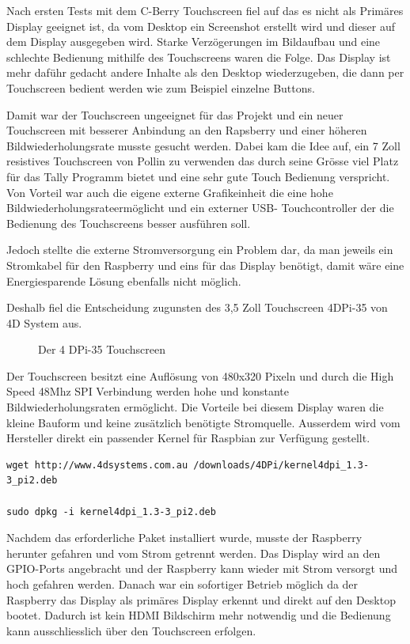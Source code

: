 \documentclass[11pt,a4paper]{article} %
\begin{document}
Nach ersten Tests mit dem C-Berry Touchscreen fiel auf das es nicht als Primäres Display geeignet ist, da vom Desktop ein Screenshot erstellt wird und dieser auf dem Display ausgegeben wird. Starke Verzögerungen im Bildaufbau und eine schlechte Bedienung mithilfe des Touchscreens waren die Folge. Das Display ist mehr daführ gedacht andere Inhalte als den Desktop wiederzugeben, die dann per Touchscreen bedient werden wie zum Beispiel einzelne Buttons.
\par
Damit war der Touchscreen ungeeignet für das Projekt und ein neuer Touchscreen mit besserer Anbindung an den Rapsberry und einer höheren Bildwiederholungsrate musste gesucht werden. Dabei kam die Idee auf, ein 7 Zoll resistives Touchscreen von Pollin \cite{11} zu verwenden das durch seine Grösse viel Platz für das Tally Programm bietet und eine sehr gute Touch Bedienung verspricht. Von Vorteil war auch die eigene externe Grafikeinheit die eine hohe Bildwiederholungsrateermöglicht  und ein externer USB- Touchcontroller der die Bedienung des Touchscreens besser ausführen soll.
\par
Jedoch stellte die externe Stromversorgung ein Problem dar, da man jeweils ein Stromkabel für den Raspberry und eins für das Display benötigt, damit wäre eine Energiesparende Lösung ebenfalls nicht möglich.
\par
Deshalb fiel die Entscheidung zugunsten des 3,5 Zoll Touchscreen 4DPi-35 von 4D System aus.\cite{6} 
\begin{figure}[h]
	\caption{Der 4 DPi-35 Touchscreen}
	\end{figure}
Der Touchscreen besitzt eine Auflösung von 480x320 Pixeln und durch die High Speed 48Mhz SPI Verbindung werden hohe und konstante Bildwiederholungsraten ermöglicht.
\newpage
Die Vorteile bei diesem Display waren die kleine Bauform und keine zusätzlich benötigte Stromquelle. Ausserdem wird vom Hersteller direkt ein passender Kernel für Raspbian zur Verfügung gestellt.
\begin{frame}

\begin{lstlisting}
wget http://www.4dsystems.com.au /downloads/4DPi/kernel4dpi_1.3-3_pi2.deb 

sudo dpkg -i kernel4dpi_1.3-3_pi2.deb
\end{lstlisting}

\end{frame}

 Nachdem das erforderliche Paket installiert wurde, musste der Raspberry herunter gefahren und vom Strom getrennt werden. Das Display wird an den GPIO-Ports angebracht und der Raspberry kann wieder mit Strom versorgt und hoch gefahren werden. Danach war ein sofortiger Betrieb möglich da der Raspberry das Display als primäres Display erkennt und direkt auf den Desktop bootet. Dadurch ist kein HDMI Bildschirm mehr notwendig und die Bedienung kann ausschliesslich über den Touchscreen erfolgen.
\par
\end{document}

